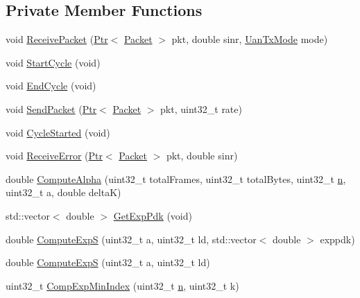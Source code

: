 \subsection*{Private Member Functions}
\begin{DoxyCompactItemize}
\item 
void \hyperlink{classns3_1_1UanMacRcGw_aa47b708b4a5a7bda0dbd4dded98723f3}{Receive\+Packet} (\hyperlink{classns3_1_1Ptr}{Ptr}$<$ \hyperlink{classns3_1_1Packet}{Packet} $>$ pkt, double sinr, \hyperlink{classns3_1_1UanTxMode}{Uan\+Tx\+Mode} mode)
\item 
void \hyperlink{classns3_1_1UanMacRcGw_ac578bc895186506f0954fa86eefa8d6a}{Start\+Cycle} (void)
\item 
void \hyperlink{classns3_1_1UanMacRcGw_afd7577179828a6dd31e59427f3c98672}{End\+Cycle} (void)
\item 
void \hyperlink{classns3_1_1UanMacRcGw_a0e3aefc24d4dffd594008152ba63269c}{Send\+Packet} (\hyperlink{classns3_1_1Ptr}{Ptr}$<$ \hyperlink{classns3_1_1Packet}{Packet} $>$ pkt, uint32\+\_\+t rate)
\item 
void \hyperlink{classns3_1_1UanMacRcGw_a9fba6730296ff817e04a485c8fc07d96}{Cycle\+Started} (void)
\item 
void \hyperlink{classns3_1_1UanMacRcGw_a00e63a2f20787c4024c763fc4aed97e4}{Receive\+Error} (\hyperlink{classns3_1_1Ptr}{Ptr}$<$ \hyperlink{classns3_1_1Packet}{Packet} $>$ pkt, double sinr)
\item 
double \hyperlink{classns3_1_1UanMacRcGw_a16f2a2f4cb6bf1bc8f3aed5c9d7d83ba}{Compute\+Alpha} (uint32\+\_\+t total\+Frames, uint32\+\_\+t total\+Bytes, uint32\+\_\+t \hyperlink{lte__link__budget__x2__handover__measures_8m_abdb05bc5a064cf642a06c83b3392f148}{n}, uint32\+\_\+t a, double deltaK)
\item 
std\+::vector$<$ double $>$ \hyperlink{classns3_1_1UanMacRcGw_aeec69b11f4b59b2afdf93d1b9e845c88}{Get\+Exp\+Pdk} (void)
\item 
double \hyperlink{classns3_1_1UanMacRcGw_a5566db3707051fb685ffe6db5a2bf9ad}{Compute\+ExpS} (uint32\+\_\+t a, uint32\+\_\+t ld, std\+::vector$<$ double $>$ exppdk)
\item 
double \hyperlink{classns3_1_1UanMacRcGw_a4c72ab2a3cf75991d00cd183218a7045}{Compute\+ExpS} (uint32\+\_\+t a, uint32\+\_\+t ld)
\item 
uint32\+\_\+t \hyperlink{classns3_1_1UanMacRcGw_af7b5b9964d69df78a894857b87b680f2}{Comp\+Exp\+Min\+Index} (uint32\+\_\+t \hyperlink{lte__link__budget__x2__handover__measures_8m_abdb05bc5a064cf642a06c83b3392f148}{n}, uint32\+\_\+t k)

\end{DoxyCompactItemize}

